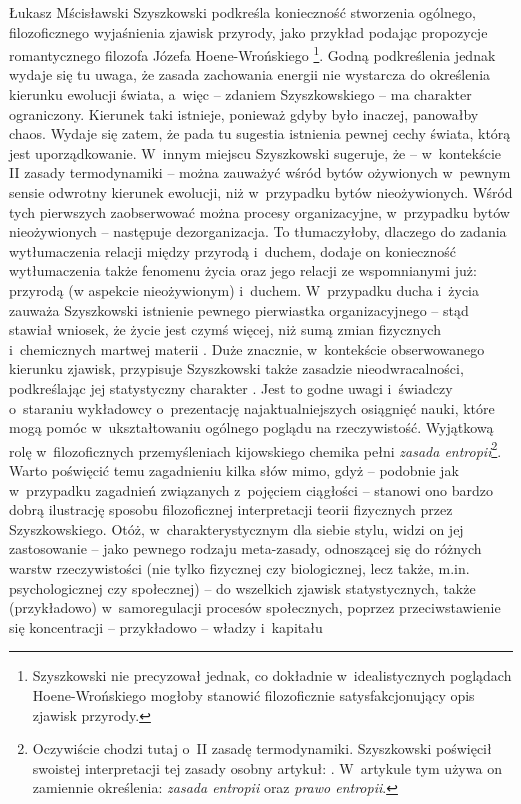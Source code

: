 \begin{artplenv}{Łukasz Mścisławski}
Szyszkowski podkreśla konieczność stworzenia ogólnego, filozoficznego wyjaśnienia zjawisk przyrody, jako przykład podając propozycje romantycznego filozofa Józefa Hoene-Wrońskiego
\parencite*[][k. 212r]{noauthor_noty_1917}%
\footnote{Szyszkowski nie precyzował jednak, co dokładnie w~idealistycznych poglądach Hoene-Wrońskiego mogłoby stanowić filozoficznie satysfakcjonujący opis zjawisk przyrody. }. Godną podkreślenia jednak wydaje się tu uwaga, że zasada zachowania energii nie wystarcza do określenia kierunku ewolucji świata, a~więc -- zdaniem Szyszkowskiego -- ma charakter ograniczony. Kierunek taki istnieje, ponieważ gdyby było inaczej, panowałby chaos. Wydaje się zatem, że pada tu sugestia istnienia pewnej cechy świata, którą jest uporządkowanie. W~innym miejscu Szyszkowski sugeruje, że -- w~kontekście II zasady termodynamiki -- można zauważyć wśród bytów ożywionych w~pewnym sensie odwrotny kierunek ewolucji, niż w~przypadku bytów nieożywionych. Wśród tych pierwszych zaobserwować można procesy organizacyjne, w~przypadku bytów nieożywionych -- następuje dezorganizacja. To tłumaczyłoby, dlaczego do zadania wytłumaczenia relacji między przyrodą i~duchem, dodaje on konieczność wytłumaczenia także fenomenu życia oraz jego relacji ze wspomnianymi już: przyrodą (w aspekcie nieożywionym) i~duchem. W~przypadku ducha i~życia zauważa Szyszkowski istnienie pewnego pierwiastka organizacyjnego -- stąd stawiał wniosek, że życie jest czymś więcej, niż sumą zmian fizycznych i~chemicznych martwej materii 
\parencite[][]{szyszkowski_entropja_1917}. %
 Duże znacznie, w~kontekście obserwowanego kierunku zjawisk, przypisuje Szyszkowski także zasadzie nieodwracalności, podkreślając jej statystyczny charakter 
\parencite[por. ][k. 217r]{noauthor_noty_1917}. %
 Jest to godne uwagi i~świadczy o~staraniu wykładowcy o~prezentację najaktualniejszych osiągnięć nauki, które mogą pomóc w~ukształtowaniu ogólnego poglądu na rzeczywistość. Wyjątkową rolę w~filozoficznych przemyśleniach kijowskiego chemika pełni \textit{zasada entropii}\footnote{Oczywiście chodzi tutaj o~II zasadę termodynamiki. Szyszkowski poświęcił swoistej interpretacji tej zasady osobny artykuł: 
\parencite[][]{szyszkowski_1909}. %
 W~artykule tym używa on zamiennie określenia: \textit{zasada entropii} oraz \textit{prawo entropii}.}. Warto poświęcić temu zagadnieniu kilka słów mimo, gdyż -- podobnie jak w~przypadku zagadnień związanych z~pojęciem ciągłości -- stanowi ono bardzo dobrą ilustrację sposobu filozoficznej interpretacji teorii fizycznych przez Szyszkowskiego. Otóż, w~charakterystycznym dla siebie stylu, widzi on jej zastosowanie -- jako pewnego rodzaju meta-zasady, odnoszącej się do różnych warstw rzeczywistości (nie tylko fizycznej czy biologicznej, lecz także, m.in. psychologicznej czy społecznej) -- do wszelkich zjawisk statystycznych, także (przykładowo) w~samoregulacji procesów społecznych, poprzez przeciwstawienie się koncentracji -- przykładowo -- władzy i~kapitału 

\end{artplenv}
